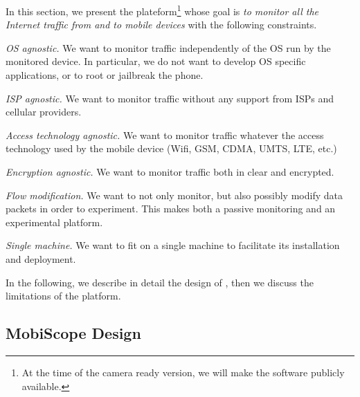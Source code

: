 In this section, we present the \platname{} plateform\footnote{At the
  time of the camera ready version, we will make the \platname{}
  software publicly available.} whose goal is \emph{to monitor all
  the Internet traffic from and to mobile devices} with the following
constraints.
\begin{packedenumerate}
\item \emph{OS agnostic.} We want to monitor traffic independently of
  the OS run by the monitored device. In particular, we do not want to
  develop OS specific applications, or to root or jailbreak the phone.
\item \emph{ISP agnostic.} We want to monitor traffic without any
  support from ISPs and cellular providers.
\item \emph{Access technology agnostic.} We want to monitor traffic
  whatever the access technology used by the mobile device (Wifi, GSM,
  CDMA, UMTS, LTE, etc.)
\item \emph{Encryption agnostic.} We want to monitor traffic both in
  clear and encrypted.
\item \emph{Flow modification.} We want to not only monitor, but
  also possibly modify data packets in order to experiment. This makes
  \platname{} both a passive monitoring and an experimental
  platform. 
\item \emph{Single machine.} We want \platname{} to fit on a
  single machine to facilitate its installation and deployment. 
 \end{packedenumerate}    

In the following, we describe in detail the design of \platname{},
then we discuss the limitations of the platform.


\subsection{MobiScope Design}




